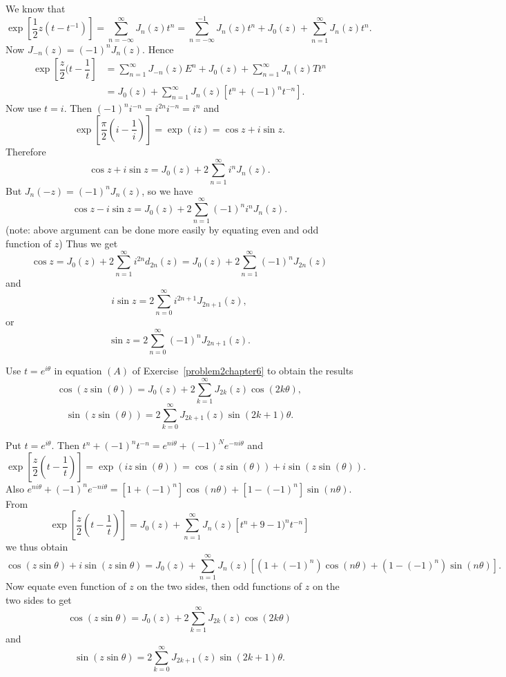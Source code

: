 \begin{solution}
We know that
$$\exp \left[ \dfrac{1}{2} z(t-t^{-1}) \right] = \displaystyle\sum_{n=-\infty}^{\infty} J_n(z)t^n = \displaystyle\sum_{n=-\infty}^{-1} J_n(z)t^n + J_0(z) + \displaystyle\sum_{n=1}^{\infty} J_n(z) t^n.$$
Now $J_{-n}(z) = (-1)^n J_n(z)$. Hence
$$\begin{array}{ll}
\exp \left[ \dfrac{z}{2}(t- \dfrac{1}{t} \right] &= \displaystyle\sum_{n=1}^{\infty} J_{-n}(z)E^n + J_0(z) + \displaystyle\sum_{n=1}^{\infty} J_n(z)Tt^n \\
&= J_0(z) + \displaystyle\sum_{n=1}^{\infty} J_n(z) [t^n + (-1)^n t^{-n}].
\end{array}$$
Now use $t=i$. Then $(-1)^n i^{-n} = i^{2n}i^{-n} = i^n$ and
$$\exp \left[ \dfrac{\pi}{2} \left( i-\dfrac{1}{i} \right) \right] = \exp(iz) = \cos z + i \sin z.$$
Therefore
$$\cos z + i \sin z = J_0(z) + 2 \displaystyle\sum_{n=1}^{\infty} i^n J_n(z).$$
But $J_n(-z) = (-1)^n J_n(z)$, so we have
$$\cos z - i \sin z = J_0(z) + 2 \displaystyle\sum_{n=1}^{\infty} (-1)^n i^n J_n(z).$$
(note: above argument can be done more easily by equating even and odd function of $z$)
Thus we get
$$\cos z = J_0(z) + 2 \displaystyle\sum_{n=1}^{\infty} i^{2n} d_{2n}(z) = J_0(z) + 2 \displaystyle\sum_{n=1}^{\infty} (-1)^n J_{2n}(z)$$
and
$$i \sin z = 2 \displaystyle\sum_{n=0}^{\infty} i^{2n+1} J_{2n+1}(z),$$
or
$$\sin z = 2 \displaystyle\sum_{n=0}^{\infty} (-1)^n J_{2n+1}(z).$$
\end{solution}
\begin{problem}\label{problem3chapter6}
Use $t=e^{i \theta}$ in equation $(A)$ of Exercise~\ref{problem2chapter6} to obtain the results
$$\cos(z \sin (\theta)) = J_0(z) + 2 \displaystyle\sum_{k=1}^{\infty} J_{2k}(z) \cos(2k \theta),$$
$$\sin (z \sin (\theta)) =  2 \displaystyle\sum_{k=0}^{\infty} J_{2k+1}(z) \sin(2k+1)\theta.$$
\end{problem}
\begin{solution}
Put $t=e^{i \theta}$. Then $t^n + (-1)^n t^{-n} = e^{ni \theta} + (-1)^N e^{-ni \theta}$ and 
$$\exp \left[ \dfrac{z}{2} \left(t - \dfrac{1}{t} \right) \right] = \exp(iz \sin(\theta)) = \cos(z \sin(\theta)) + i \sin(z \sin (\theta)).$$
Also $e^{ni \theta}+(-1)^n e^{-ni \theta} = [ 1 + (-1)^n] \cos (n \theta) + [1 - (-1)^n]  \sin (n \theta).$
From 
$$\exp \left[ \dfrac{z}{2} \left(t - \dfrac{1}{t} \right) \right] = J_0(z) + \displaystyle\sum_{n=1}^{\infty} J_n(z) [t^n + 9-1)^n t^{-n}]$$
we thus obtain
$$\cos(z \sin \theta) + i \sin (z \sin \theta) = J_0(z) + \displaystyle\sum_{n=1}^{\infty} J_n(z) [(1 + (-1)^n) \cos(n \theta) + (1 - (-1)^n) \sin(n \theta)].$$
Now equate even function of $z$ on the two sides, then odd functions of $z$ on the two sides to get
$$\cos(z \sin \theta) = J_0(z) + 2 \displaystyle\sum_{k=1}^{\infty} J_{2k}(z) \cos(2k \theta)$$
and
$$\sin(z \sin \theta) = 2 \displaystyle\sum_{k=0}^{\infty} J_{2k+1}(z) \sin(2k+1)\theta.$$
\end{solution}
